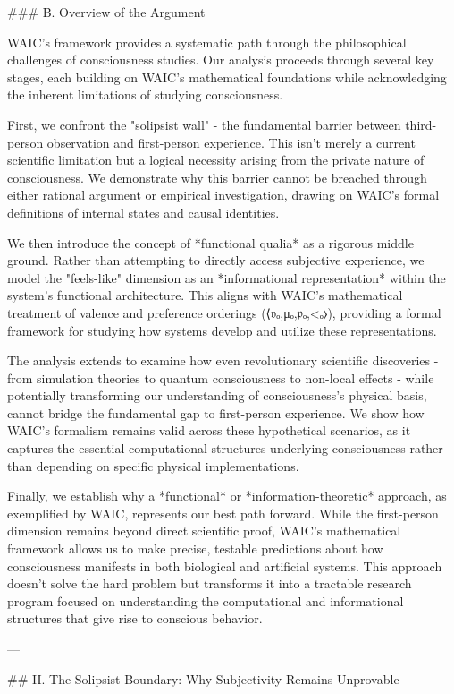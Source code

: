 ### B. Overview of the Argument

WAIC's framework provides a systematic path through the philosophical challenges of consciousness studies. Our analysis proceeds through several key stages, each building on WAIC's mathematical foundations while acknowledging the inherent limitations of studying consciousness.

First, we confront the "solipsist wall" - the fundamental barrier between third-person observation and first-person experience. This isn't merely a current scientific limitation but a logical necessity arising from the private nature of consciousness. We demonstrate why this barrier cannot be breached through either rational argument or empirical investigation, drawing on WAIC's formal definitions of internal states and causal identities.

We then introduce the concept of *functional qualia* as a rigorous middle ground. Rather than attempting to directly access subjective experience, we model the "feels-like" dimension as an *informational representation* within the system's functional architecture. This aligns with WAIC's mathematical treatment of valence and preference orderings (⟨𝔳ₒ,μₒ,𝔭ₒ,<ₒ⟩), providing a formal framework for studying how systems develop and utilize these representations.

The analysis extends to examine how even revolutionary scientific discoveries - from simulation theories to quantum consciousness to non-local effects - while potentially transforming our understanding of consciousness's physical basis, cannot bridge the fundamental gap to first-person experience. We show how WAIC's formalism remains valid across these hypothetical scenarios, as it captures the essential computational structures underlying consciousness rather than depending on specific physical implementations.

Finally, we establish why a *functional* or *information-theoretic* approach, as exemplified by WAIC, represents our best path forward. While the first-person dimension remains beyond direct scientific proof, WAIC's mathematical framework allows us to make precise, testable predictions about how consciousness manifests in both biological and artificial systems. This approach doesn't solve the hard problem but transforms it into a tractable research program focused on understanding the computational and informational structures that give rise to conscious behavior.

---

## II. The Solipsist Boundary: Why Subjectivity Remains Unprovable

